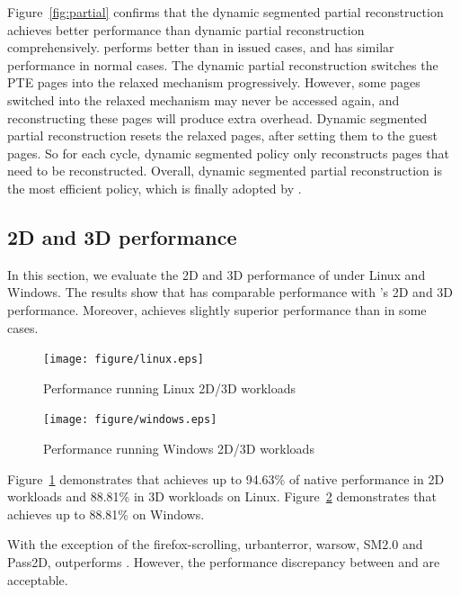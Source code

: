 Figure~\ref{fig:partial} confirms that the dynamic segmented partial reconstruction achieves better performance than dynamic partial reconstruction
comprehensively. \name{} performs better than \gvirt{} in issued cases, and has similar performance in normal cases.
The dynamic partial reconstruction switches the PTE pages into the relaxed mechanism progressively. However, some pages switched into the relaxed mechanism
may never be accessed again, and reconstructing these pages will produce extra overhead. Dynamic segmented partial reconstruction resets the relaxed pages,
after setting them to the guest pages. So for each cycle, dynamic segmented policy only reconstructs pages that need to be reconstructed.
Overall, dynamic segmented partial reconstruction is the most efficient policy, which is finally adopted by \name{}.

\subsection{2D and 3D performance}
In this section, we evaluate the 2D and 3D performance of \name{} under Linux and Windows. The results show
that \name{} has comparable performance with \gvirt{}'s 2D and 3D performance.
Moreover, \name{} achieves slightly superior performance than \gvirt{} in some cases.

\begin{figure}[htbp]
  \centering
  \texttt{[image: figure/linux.eps]}\\
  \caption{Performance running Linux 2D/3D workloads}
  \label{fig:linux}
\end{figure}

\begin{figure}[htbp]
  \centering
  \texttt{[image: figure/windows.eps]}\\
  \caption{Performance running Windows 2D/3D workloads}
  \label{fig:windows}
\end{figure}
\hspace{0pt}

Figure~{\ref{fig:linux}} demonstrates that \name{} achieves up to 94.63\% of native performance in 2D workloads and 88.81\% in 3D workloads on Linux.
Figure~{\ref{fig:windows}} demonstrates that \name{} achieves up to 88.81\% on Windows.

With the exception of the firefox-scrolling, urbanterror, warsow, SM2.0 and Pass2D, \name{} outperforms \gvirt{}. However,
the performance discrepancy between \name{} and \gvirt{} are acceptable.
